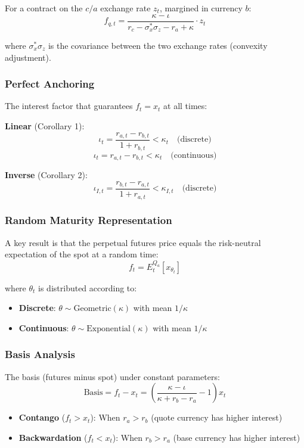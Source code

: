 For a contract on the $c/a$ exchange rate $z_t$, margined in currency $b$:
\[
f_{q,t} = \frac{\kappa - \iota}{r_c - \sigma_x^* \sigma_z - r_a + \kappa} \cdot z_t
\]

where $\sigma_x^* \sigma_z$ is the covariance between the two exchange rates (convexity adjustment).

\subsubsection{Perfect Anchoring}

The interest factor that guarantees $f_t = x_t$ at all times:

\textbf{Linear} (Corollary 1):
\[
\iota_t = \frac{r_{a,t} - r_{b,t}}{1 + r_{b,t}} < \kappa_t \quad \text{(discrete)}
\]
\[
\iota_t = r_{a,t} - r_{b,t} < \kappa_t \quad \text{(continuous)}
\]

\textbf{Inverse} (Corollary 2):
\[
\iota_{I,t} = \frac{r_{b,t} - r_{a,t}}{1 + r_{a,t}} < \kappa_{I,t} \quad \text{(discrete)}
\]

\subsubsection{Random Maturity Representation}

A key result is that the perpetual futures price equals the risk-neutral expectation of the spot at a random time:
\[
f_t = E^{Q_a}_t[x_{\theta_t}]
\]

where $\theta_t$ is distributed according to:
\begin{itemize}
  \item \textbf{Discrete}: $\theta \sim \text{Geometric}(\kappa)$ with mean $1/\kappa$
  \item \textbf{Continuous}: $\theta \sim \text{Exponential}(\kappa)$ with mean $1/\kappa$
\end{itemize}

\subsubsection{Basis Analysis}

The basis (futures minus spot) under constant parameters:
\[
\text{Basis} = f_t - x_t = \left(\frac{\kappa - \iota}{\kappa + r_b - r_a} - 1\right) x_t
\]

\begin{itemize}
  \item \textbf{Contango} ($f_t > x_t$): When $r_a > r_b$ (quote currency has higher interest)
  \item \textbf{Backwardation} ($f_t < x_t$): When $r_b > r_a$ (base currency has higher interest)
\end{itemize}

